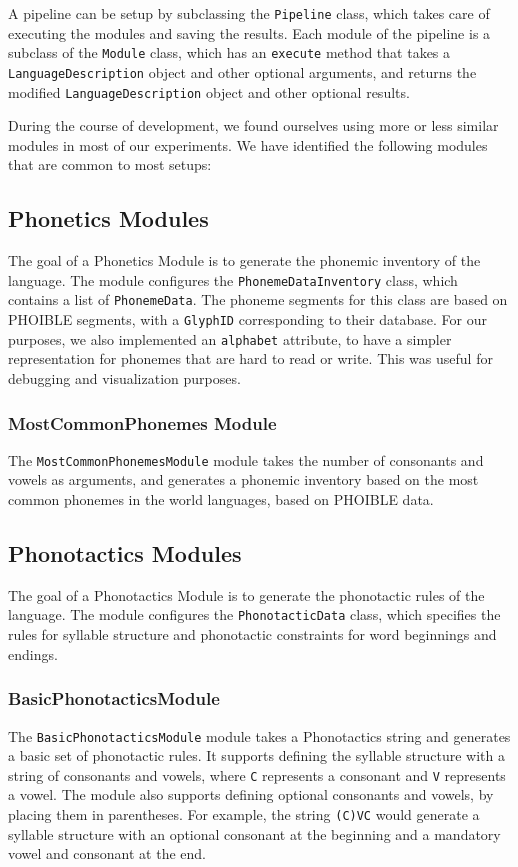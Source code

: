 A pipeline can be setup by subclassing the \texttt{Pipeline} class, which takes care of executing the modules and saving the results. Each module of the pipeline 
is a subclass of the \texttt{Module} class, which has an \texttt{execute} method that takes a \texttt{LanguageDescription} object and other optional arguments,
and returns the modified \texttt{LanguageDescription} object and other optional results.

During the course of development, we found ourselves using more or less similar modules in most of our experiments. We have identified the following modules that are common to most
setups:

\subsection{Phonetics Modules}

The goal of a Phonetics Module is to generate the phonemic inventory of the language. The module configures the \texttt{PhonemeDataInventory} class, which
contains a list of \texttt{PhonemeData}. The phoneme segments for this class are based on PHOIBLE \cite{phoible} segments, with a \texttt{GlyphID} corresponding
to their database. For our purposes, we also implemented an \texttt{alphabet} attribute, to have a simpler representation for phonemes that are
hard to read or write. This was useful for debugging and visualization purposes.

\subsubsection{MostCommonPhonemes Module}
The \texttt{MostCommonPhonemesModule} module takes the number of consonants and vowels as arguments, and generates a phonemic inventory based on the most common
phonemes in the world languages, based on PHOIBLE \cite{phoible} data.

\subsection{Phonotactics Modules}
The goal of a Phonotactics Module is to generate the phonotactic rules of the language. The module configures the \texttt{PhonotacticData} class, which
specifies the rules for syllable structure and phonotactic constraints for word beginnings and endings.

\subsubsection{BasicPhonotacticsModule}
The \texttt{BasicPhonotacticsModule} module takes a Phonotactics string and generates a basic set of phonotactic rules. It supports defining the syllable structure
with a string of consonants and vowels, where \texttt{C} represents a consonant and \texttt{V} represents a vowel. The module also supports defining
optional consonants and vowels, by placing them in parentheses. For example, the string \texttt{(C)VC} would generate a syllable structure with an optional consonant at the beginning and
a mandatory vowel and consonant at the end.

